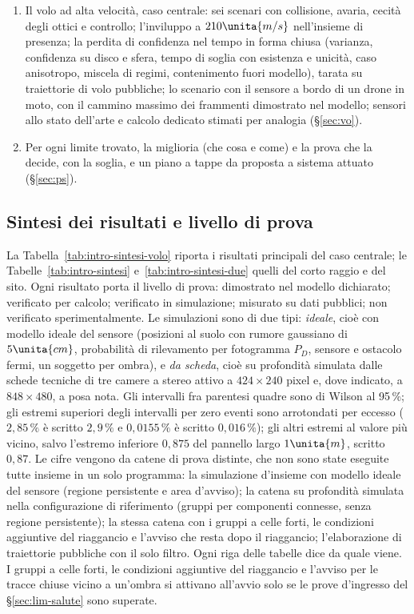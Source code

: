 \begin{enumerate}[label=\arabic*.]
\item Il volo ad alta velocità, caso centrale: sei scenari con collisione, avaria, cecità degli ottici e controllo; l'inviluppo a $210\unita{m/s}$ nell'insieme di presenza; la perdita di confidenza nel tempo in forma chiusa (varianza, confidenza su disco e sfera, tempo di soglia con esistenza e unicità, caso anisotropo, miscela di regimi, contenimento fuori modello), tarata su traiettorie di volo pubbliche; lo scenario con il sensore a bordo di un drone in moto, con il cammino massimo dei frammenti dimostrato nel modello; sensori allo stato dell'arte e calcolo dedicato stimati per analogia (\S\ref{sec:vo}).
\item Per ogni limite trovato, la miglioria (che cosa e come) e la prova che la decide, con la soglia, e un piano a tappe da proposta a sistema attuato (\S\ref{sec:ps}).
\end{enumerate}

\subsection{Sintesi dei risultati e livello di prova}\label{sec:intro-sintesi}

La Tabella~\ref{tab:intro-sintesi-volo} riporta i risultati principali del caso centrale; le Tabelle~\ref{tab:intro-sintesi} e~\ref{tab:intro-sintesi-due} quelli del corto raggio e del sito. Ogni risultato porta il livello di prova:  dimostrato nel modello dichiarato;  verificato per calcolo;  verificato in simulazione;  misurato su dati pubblici;  non verificato sperimentalmente. Le simulazioni sono di due tipi: \emph{ideale}, cioè con modello ideale del sensore (posizioni al suolo con rumore gaussiano di $5\unita{cm}$, probabilità di rilevamento per fotogramma $P_D$, sensore e ostacolo fermi, un soggetto per ombra), e \emph{da scheda}, cioè su profondità simulata dalle schede tecniche di tre camere a stereo attivo a $424\times240$ pixel e, dove indicato, a $848\times480$, a posa nota. Gli intervalli fra parentesi quadre sono di Wilson al 95\,\%; gli estremi superiori degli intervalli per zero eventi sono arrotondati per eccesso ($2{,}85\,\%$ è scritto $2{,}9\,\%$ e $0{,}0155\,\%$ è scritto $0{,}016\,\%$); gli altri estremi al valore più vicino, salvo l'estremo inferiore $0{,}875$ del pannello largo $1\unita{m}$, scritto $0{,}87$. Le cifre vengono da catene di prova distinte, che non sono state eseguite tutte insieme in un solo programma: la simulazione d'insieme con modello ideale del sensore (regione persistente e area d'avviso); la catena su profondità simulata nella configurazione di riferimento (gruppi per componenti connesse, senza regione persistente); la stessa catena con i gruppi a celle forti, le condizioni aggiuntive del riaggancio e l'avviso che resta dopo il riaggancio; l'elaborazione di traiettorie pubbliche con il solo filtro. Ogni riga delle tabelle dice da quale viene. I gruppi a celle forti, le condizioni aggiuntive del riaggancio e l'avviso per le tracce chiuse vicino a un'ombra si attivano all'avvio solo se le prove d'ingresso del \S\ref{sec:lim-salute} sono superate.

